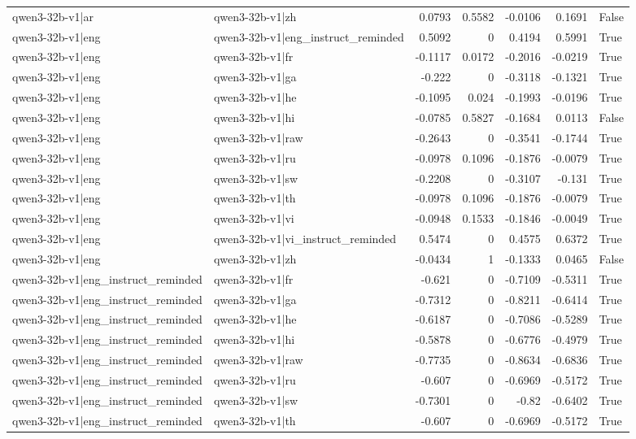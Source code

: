 \begin{table}
\begin{tabular}{l l r r r r l}
qwen3-32b-v1|ar & qwen3-32b-v1|zh & 0.0793 & 0.5582 & -0.0106 & 0.1691 & False \\
qwen3-32b-v1|eng & qwen3-32b-v1|eng_instruct_reminded & 0.5092 & 0 & 0.4194 & 0.5991 & True \\
qwen3-32b-v1|eng & qwen3-32b-v1|fr & -0.1117 & 0.0172 & -0.2016 & -0.0219 & True \\
qwen3-32b-v1|eng & qwen3-32b-v1|ga & -0.222 & 0 & -0.3118 & -0.1321 & True \\
qwen3-32b-v1|eng & qwen3-32b-v1|he & -0.1095 & 0.024 & -0.1993 & -0.0196 & True \\
qwen3-32b-v1|eng & qwen3-32b-v1|hi & -0.0785 & 0.5827 & -0.1684 & 0.0113 & False \\
qwen3-32b-v1|eng & qwen3-32b-v1|raw & -0.2643 & 0 & -0.3541 & -0.1744 & True \\
qwen3-32b-v1|eng & qwen3-32b-v1|ru & -0.0978 & 0.1096 & -0.1876 & -0.0079 & True \\
qwen3-32b-v1|eng & qwen3-32b-v1|sw & -0.2208 & 0 & -0.3107 & -0.131 & True \\
qwen3-32b-v1|eng & qwen3-32b-v1|th & -0.0978 & 0.1096 & -0.1876 & -0.0079 & True \\
qwen3-32b-v1|eng & qwen3-32b-v1|vi & -0.0948 & 0.1533 & -0.1846 & -0.0049 & True \\
qwen3-32b-v1|eng & qwen3-32b-v1|vi_instruct_reminded & 0.5474 & 0 & 0.4575 & 0.6372 & True \\
qwen3-32b-v1|eng & qwen3-32b-v1|zh & -0.0434 & 1 & -0.1333 & 0.0465 & False \\
qwen3-32b-v1|eng_instruct_reminded & qwen3-32b-v1|fr & -0.621 & 0 & -0.7109 & -0.5311 & True \\
qwen3-32b-v1|eng_instruct_reminded & qwen3-32b-v1|ga & -0.7312 & 0 & -0.8211 & -0.6414 & True \\
qwen3-32b-v1|eng_instruct_reminded & qwen3-32b-v1|he & -0.6187 & 0 & -0.7086 & -0.5289 & True \\
qwen3-32b-v1|eng_instruct_reminded & qwen3-32b-v1|hi & -0.5878 & 0 & -0.6776 & -0.4979 & True \\
qwen3-32b-v1|eng_instruct_reminded & qwen3-32b-v1|raw & -0.7735 & 0 & -0.8634 & -0.6836 & True \\
qwen3-32b-v1|eng_instruct_reminded & qwen3-32b-v1|ru & -0.607 & 0 & -0.6969 & -0.5172 & True \\
qwen3-32b-v1|eng_instruct_reminded & qwen3-32b-v1|sw & -0.7301 & 0 & -0.82 & -0.6402 & True \\
qwen3-32b-v1|eng_instruct_reminded & qwen3-32b-v1|th & -0.607 & 0 & -0.6969 & -0.5172 & True \\

\end{tabular}
\end{table}
